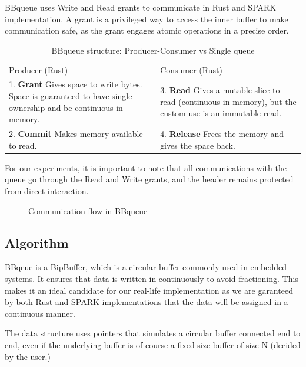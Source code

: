 \documentclass[nomenclature, english, bibtex]{kththesis}
\begin{document}
BBqueue uses Write and Read grants to communicate in Rust and SPARK implementation. A grant is a
privileged way to access the inner buffer to make communication safe, as the grant engages atomic operations in a precise order. 

\begin{table}[ht!]
\footnotesize
\centering
\caption{BBqueue structure: Producer-Consumer vs Single queue}
\label{tab:bbqueue}
\begin{tabular}{ |m{5cm}|m{5cm}| }
\hline
\rowcolor{color1bg_fill}
\multicolumn{2}{|c|}{BBQueue (SPARK)} \\
\hline
\rowcolor{color1bg_fill}
\centering Producer (Rust) & \centering Consumer (Rust) \tabularnewline
\hline
1. \textbf{Grant} \newline Gives space to write bytes. Space is guaranteed to have single ownership and be continuous in memory. & 3. \textbf{Read} \newline Gives a mutable slice to read (continuous in memory), but the custom use is an immutable read. \tabularnewline
\hline
2. \textbf{Commit} \newline Makes memory available to read. & 4. \textbf{Release} \newline Frees the memory and gives the space back. \tabularnewline
\hline
\end{tabular}
\end{table}
\FloatBarrier
For our experiments, it is important to note that all communications with the queue go through the Read and Write grants, and the header remains protected from direct interaction. 

\begin{figure}[ht!]
  \centering 

\caption{Communication flow in BBqueue}
\end{figure}
\FloatBarrier

\subsection{Algorithm}

BBqeue is a BipBuffer, which is a circular buffer commonly used in embedded systems. It ensures that data is written in continuously to avoid fractioning. This makes it an ideal candidate for our real-life implementation as we are garanteed by both Rust and SPARK implementations that the data will be assigned in a continuous manner.

The data structure uses pointers that simulates a circular buffer connected end to end, even if the underlying buffer is of course a fixed size buffer of size N (decided by the user.)  
\end{document}
